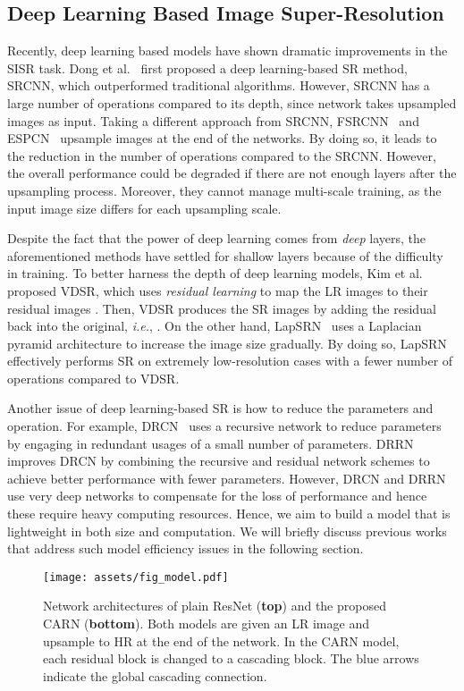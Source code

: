 \documentclass[runningheads]{llncs}
\begin{document}
\subsection{Deep Learning Based Image Super-Resolution}
\label{subsec:sisr}
Recently, deep learning based models have shown dramatic improvements in the SISR task. Dong et al.~\cite{srcnn2014} first proposed a deep learning-based SR method, SRCNN, which outperformed traditional algorithms. However, SRCNN has a large number of operations compared to its depth, since network takes upsampled images as input. Taking a different approach from SRCNN, FSRCNN~\cite{fsrcnn2016} and ESPCN~\cite{espcn2016} upsample images at the end of the networks. By doing so, it leads to the reduction in the number of operations compared to the SRCNN. However, the overall performance could be degraded if there are not enough layers after the upsampling process. Moreover, they cannot manage multi-scale training, as the input image size differs for each upsampling scale.

Despite the fact that the power of deep learning comes from \textit{deep} layers, the aforementioned methods have settled for shallow layers because of the difficulty in training. To better harness the depth of deep learning models, Kim et al.~\cite{vdsr2016} proposed VDSR, which uses \textit{residual learning} to map the LR images  to their residual images . Then, VDSR produces the SR images  by adding the residual back into the original, \textit{i.e.}, . On the other hand, LapSRN~\cite{lapsrn2017} uses a Laplacian pyramid architecture to increase the image size gradually. By doing so, LapSRN effectively performs SR on extremely low-resolution cases with a fewer number of operations compared to VDSR.

Another issue of deep learning-based SR is how to reduce the parameters and operation. For example, DRCN~\cite{drcn2016} uses a recursive network to reduce parameters by engaging in redundant usages of a small number of parameters. DRRN~\cite{drnn2017} improves  DRCN by combining the recursive and residual network schemes to achieve better performance with fewer parameters. However, DRCN and DRRN use very deep networks to compensate for the loss of performance and hence these require heavy computing resources. Hence, we aim to build a model that is lightweight in both size and computation. We will briefly discuss previous works that address such model efficiency issues in the following section.

\begin{figure}[t]
    \centering
    \texttt{[image: assets/fig\_model.pdf]}
    \caption{Network architectures of plain ResNet (\textbf{top}) and the proposed CARN (\textbf{bottom}). Both models are given an LR image and upsample to HR at the end of the network. In the CARN model, each residual block is changed to a cascading block. The blue arrows indicate the global cascading connection.}
    \label{fig:model}
\end{figure}
\end{document}
